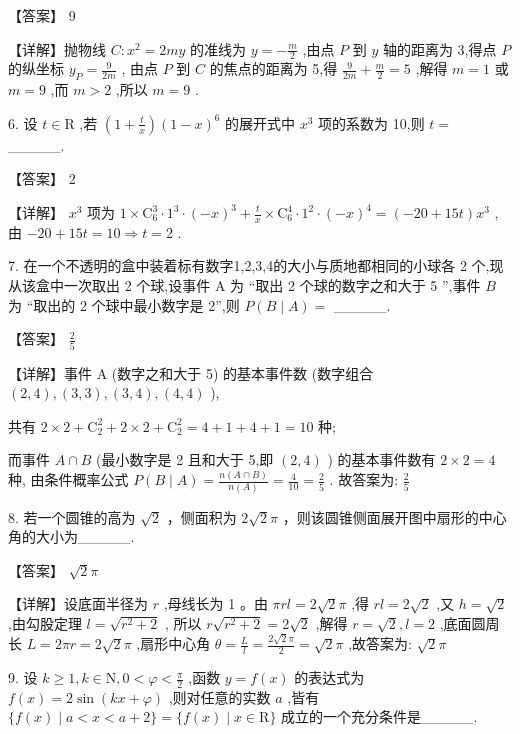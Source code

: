 \documentclass[10pt]{article}
\begin{document}
【答案】 9

【详解】抛物线 \(C : {x}^{2} = {2my}\) 的准线为 \(y =  - \frac{m}{2}\) ,由点 \(P\) 到 \(y\) 轴的距离为 3,得点 \(P\) 的纵坐标 \({y}_{P} = \frac{9}{2m}\) , 由点 \(P\) 到 \(C\) 的焦点的距离为 5,得 \(\frac{9}{2m} + \frac{m}{2} = 5\) ,解得 \(m = 1\) 或 \(m = 9\) ,而 \(m > 2\) ,所以 \(m = 9\) .

6. 设 \(t \in  \mathrm{R}\) ,若 \(\left( {1 + \frac{t}{x}}\right) {\left( 1 - x\right) }^{6}\) 的展开式中 \({x}^{3}\) 项的系数为 10,则 \(t =\) \_\_\_\_\_.

【答案】 2

【详解】 \({x}^{3}\) 项为 \(1 \times  {\mathrm{C}}_{6}^{3} \cdot  {1}^{3} \cdot  {\left( -x\right) }^{3} + \frac{t}{x} \times  {\mathrm{C}}_{6}^{4} \cdot  {1}^{2} \cdot  {\left( -x\right) }^{4} = \left( {-{20} + {15t}}\right) {x}^{3}\) ,由 \(- {20} + {15t} = {10} \Rightarrow  t = 2\) .

7. 在一个不透明的盒中装着标有数字1,2,3,4的大小与质地都相同的小球各 2 个,现从该盒中一次取出 2 个球,设事件 A 为 “取出 2 个球的数字之和大于 5 ”,事件 \(B\) 为 “取出的 2 个球中最小数字是 2”,则 \(P\left( {B \mid  A}\right)  =\) \_\_\_\_\_.

【答案】 \(\frac{2}{5}\)

【详解】事件 A (数字之和大于 5) 的基本事件数 (数字组合 \(\left( {2,4}\right) ,\left( {3,3}\right) ,\left( {3,4}\right) ,\left( {4,4}\right)\) ),

共有 \(2 \times  2 + {\mathrm{C}}_{2}^{2} + 2 \times  2 + {\mathrm{C}}_{2}^{2} = 4 + 1 + 4 + 1 = {10}\) 种;

而事件 \(A \cap  B\) (最小数字是 2 且和大于 5,即 \(\left( {2,4}\right)\) ) 的基本事件数有 \(2 \times  2 = 4\) 种, 由条件概率公式 \(P\left( {B \mid  A}\right)  = \frac{n\left( {A \cap  B}\right) }{n\left( A\right) } = \frac{4}{10} = \frac{2}{5}\) . 故答案为: \(\frac{2}{5}\)

8. 若一个圆锥的高为 \(\sqrt{2}\) ，侧面积为 \(2\sqrt{2}\pi\) ，则该圆锥侧面展开图中扇形的中心角的大小为\_\_\_\_\_.

【答案】 \(\sqrt{2}\pi\)

【详解】设底面半径为 \(r\) ,母线长为 1 。由 \({\pi rl} = 2\sqrt{2}\pi\) ,得 \({rl} = 2\sqrt{2}\) ,又 \(h = \sqrt{2}\) ,由勾股定理 \(l = \sqrt{{r}^{2} + 2}\) , 所以 \(r\sqrt{{r}^{2} + 2} = 2\sqrt{2}\) ,解得 \(r = \sqrt{2},l = 2\) ,底面圆周长 \(L = {2\pi r} = 2\sqrt{2}\pi\) ,扇形中心角 \(\theta  = \frac{L}{l} = \frac{2\sqrt{2}\pi }{2} = \sqrt{2}\pi\) ,故答案为: \(\sqrt{2}\pi\)

9. 设 \(k \geq  1,k \in  \mathrm{N},0 < \varphi  < \frac{\pi }{2}\) ,函数 \(y = f\left( x\right)\) 的表达式为 \(f\left( x\right)  = 2\sin \left( {{kx} + \varphi }\right)\) ,则对任意的实数 \(a\) ,皆有 \(\{ f\left( x\right)  \mid  a < x < a + 2\}  = \{ f\left( x\right)  \mid  x \in  \mathrm{R}\}\) 成立的一个充分条件是\_\_\_\_\_.
\end{document}
